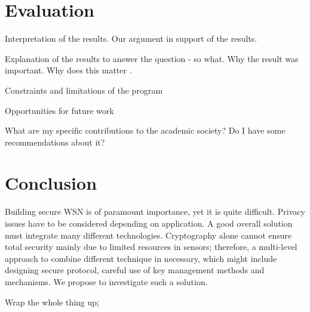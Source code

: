 \documentclass[conference,final]{IEEEtran}
\begin{document}
%
%

\section{Evaluation}
\label{sec:eval}
Interpretation of the results.
Our argument in support of the results.

Explanation of the results to answer the question - so what.
Why the result was important.
Why does this matter .

Constraints and limitations of the program

Opportunities for future work

What are my specific contributions to the academic society?
Do I have some recommendations about it?


\section{Conclusion}

Building secure WSN is of paramount importance, yet it is quite difficult. Privacy issues have to be considered depending on application. A good overall solution must integrate many different technologies. Cryptography alone cannot ensure total security mainly due to limited resources in sensors; therefore, a multi-level approach to combine different technique in necessary, which might  include designing secure protocol, careful use of key management methods and mechanisms. We propose to investigate such a solution.

\label{sec:conc}
Wrap the whole thing up;


\end{document}
